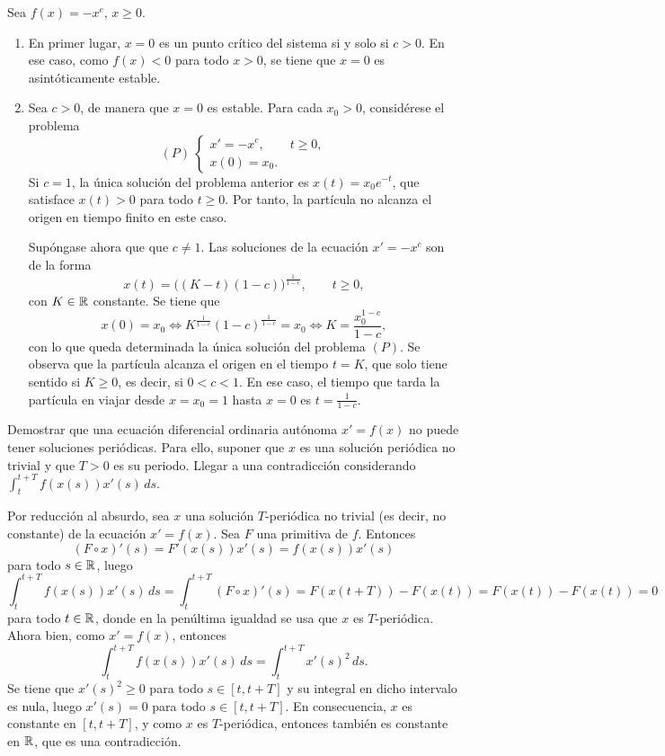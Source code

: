 \documentclass[11pt]{report}
\begin{document}
\begin{solution}
    Sea $f(x) = -x^c$, $x \geq 0$.
    \begin{enumerate}
        \item En primer lugar, $x = 0$ es un punto crítico del sistema si y solo si $c > 0$. En ese caso, como $f(x) < 0$ para todo $x > 0$, se tiene que $x = 0$ es asintóticamente estable.
        \item Sea $c > 0$, de manera que $x = 0$ es estable. Para cada $x_0 > 0$, considérese el problema
        \[
            (P) \ \begin{cases}
                x'=-x^c, \qquad t \geq 0, \\
                x(0) = x_0.
            \end{cases}
        \]
        Si $c = 1$, la única solución del problema anterior es $x(t)= x_0e^{-t}$, que satisface $x(t) > 0$ para todo $t \geq 0$. Por tanto, la partícula no alcanza el origen en tiempo finito en este caso.
        
        Supóngase ahora que que $c \neq 1$. Las soluciones de la ecuación $x'=-x^c$ son de la forma
        \[x(t) = \bigl((K-t)(1-c)\bigr)^{\frac{1}{1-c}}, \qquad t \geq 0,\]
        con $K \in\mathbb R$ constante. Se tiene que
        \[x(0) = x_0 \iff K^{\frac{1}{1-c}}(1-c)^{\frac{1}{1-c}} = x_0 \iff K = \frac{x_0^{1-c}}{1-c},\]
        con lo que queda determinada la única solución del problema $(P)$. Se observa que la partícula alcanza el origen en el tiempo $t = K$, que solo tiene sentido si $K \geq 0$, es decir, si $0 < c < 1$. En ese caso, el tiempo que tarda la partícula en viajar desde $x = x_0 = 1$ hasta $x = 0$ es $t = \frac{1}{1-c}$.
    \end{enumerate}
\end{solution}

\begin{exercise}
    Demostrar que una ecuación diferencial ordinaria autónoma $x'=f(x)$ no puede tener soluciones periódicas. Para ello, suponer que $x$ es una solución periódica no trivial y que $T>0$ es su periodo. Llegar a una contradicción considerando $\int_t^{t+T}f(x(s))x'(s)\, ds$.
\end{exercise}

\begin{solution}
    Por reducción al absurdo, sea $x$ una solución $T$-periódica no trivial (es decir, no constante) de la ecuación $x'=f(x)$. Sea $F$ una primitiva de $f$. Entonces
    \[(F \circ x)'(s) = F'(x(s))x'(s) = f(x(s))x'(s)\]
    para todo $s \in \mathbb R$, luego
    \[\int_t^{t+T}f(x(s))x'(s)\, ds = \int_t^{t+T}(F\circ x)'(s) = F(x(t+T))-F(x(t)) = F(x(t))-F(x(t))=0\]
    para todo $t \in \mathbb R$, donde en la penúltima igualdad se usa que $x$ es $T$-periódica. Ahora bien, como $x'= f(x)$, entonces
    \[\int_t^{t+T}f(x(s))x'(s)\, ds = \int_t^{t+T}x'(s)^2\, ds.\]
    Se tiene que $x'(s)^2 \geq 0$ para todo $s \in [t,t+T]$ y su integral en dicho intervalo es nula, luego $x'(s) = 0$ para todo $s \in [t,t+T]$. En consecuencia, $x$ es constante en $[t,t+T]$, y como $x$ es $T$-periódica, entonces también es constante en $\mathbb R$, que es una contradicción.
\end{solution}
\end{document}
